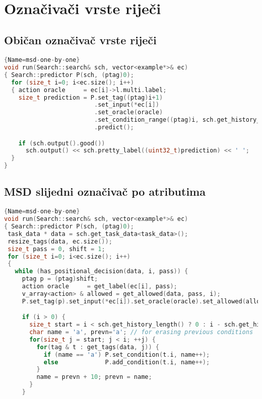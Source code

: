 \begin{appendix}\

\chapter{Označivači vrste riječi}
\section{Običan označivač vrste riječi}
\label{appendix:postagging}
\begin{lstlisting}[language=C++,
                   basicstyle=\scriptsize\ttfamily]{Name=msd-one-by-one}
void run(Search::search& sch, vector<example*>& ec)
{ Search::predictor P(sch, (ptag)0);
  for (size_t i=0; i<ec.size(); i++)
  { action oracle     = ec[i]->l.multi.label;
    size_t prediction = P.set_tag((ptag)i+1)
                         .set_input(*ec[i])
                         .set_oracle(oracle)
                         .set_condition_range((ptag)i, sch.get_history_length(), 'p')
                         .predict();

    if (sch.output().good())
      sch.output() << sch.pretty_label((uint32_t)prediction) << ' ';
  }
}
\end{lstlisting}
\newpage
\section{MSD slijedni označivač po atributima}\label{appendix:msdattr}
\begin{lstlisting}[language=C++,
                   basicstyle=\scriptsize\ttfamily]{Name=msd-one-by-one}
void run(Search::search& sch, vector<example*>& ec)
{ Search::predictor P(sch, (ptag)0);
 task_data * data = sch.get_task_data<task_data>();
 resize_tags(data, ec.size());
 size_t pass = 0, shift = 1;
 for (size_t i=0; i<ec.size(); i++)
 {
   while (has_positional_decision(data, i, pass)) {
     ptag p = (ptag)shift;
     action oracle     = get_label(ec[i], pass);
     v_array<action> & allowed = get_allowed(data, pass, i);
     P.set_tag(p).set_input(*ec[i]).set_oracle(oracle).set_allowed(allowed);

     if (i > 0) {
       size_t start = i < sch.get_history_length() ? 0 : i - sch.get_history_length();
       char name = 'a', prevn='a'; // for erasing previous conditions
       for(size_t j = start; j < i; ++j) {
         for(tag & t : get_tags(data, j)) {
           if (name == 'a') P.set_condition(t.i, name++);
           else             P.add_condition(t.i, name++);
         }
         name = prevn + 10; prevn = name;
       }
     }


\end{lstlisting}
\end{appendix}
